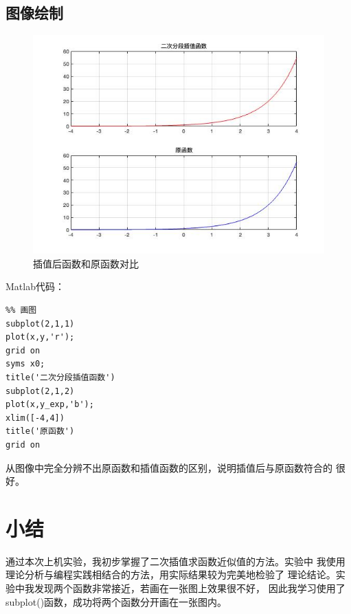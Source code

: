 \documentclass[a4paper,12pt]{ctexart}
\begin{document}
\subsection{图像绘制}
\begin{figure}[H]
    \centering
    \caption{插值后函数和原函数对比}
    \includegraphics[width=13cm]{上机4/1.jpg}
\end{figure}
Matlab代码：
\begin{lstlisting}
%% 画图
subplot(2,1,1)
plot(x,y,'r');
grid on
syms x0;
title('二次分段插值函数')
subplot(2,1,2)
plot(x,y_exp,'b');
xlim([-4,4])
title('原函数')
grid on
\end{lstlisting}
\par
从图像中完全分辨不出原函数和插值函数的区别，说明插值后与原函数符合的
很好。

\section{小结}
\par
通过本次上机实验，我初步掌握了二次插值求函数近似值的方法。实验中
我使用理论分析与编程实践相结合的方法，用实际结果较为完美地检验了
理论结论。实验中我发现两个函数非常接近，若画在一张图上效果很不好，
因此我学习使用了subplot()函数，成功将两个函数分开画在一张图内。
\end{document}
